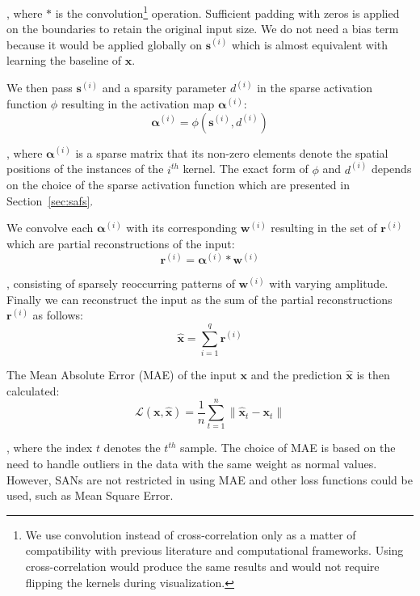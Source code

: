 \documentclass[journal]{IEEEtran}
\begin{document}
\noindent
, where $*$ is the convolution\footnote{We use convolution instead of cross-correlation only as a matter of compatibility with previous literature and computational frameworks. Using cross-correlation would produce the same results and would not require flipping the kernels during visualization.} operation.
Sufficient padding with zeros is applied on the boundaries to retain the original input size.
We do not need a bias term because it would be applied globally on $\bm{s}^{(i)}$ which is almost equivalent with learning the baseline of $\bm{x}$.

We then pass $\bm{s}^{(i)}$ and a sparsity parameter $d^{(i)}$ in the sparse activation function $\phi$ resulting in the activation map $\bm{\alpha}^{(i)}$:
\begin{equation}
	\label{eq:extrema}
	\bm{\alpha}^{(i)} = \phi(\bm{s}^{(i)}, d^{(i)})
\end{equation}

\noindent
, where $\bm{\alpha}^{(i)}$ is a sparse matrix that its non-zero elements denote the spatial positions of the instances of the $i^{th}$ kernel.
The exact form of $\phi$ and $d^{(i)}$ depends on the choice of the sparse activation function which are presented in Section~\ref{sec:safs}.

We convolve each $\bm{\alpha}^{(i)}$ with its corresponding $\bm{w}^{(i)}$ resulting in the set of $\bm{r}^{(i)}$ which are partial reconstructions of the input:
\begin{equation}
	\label{eq:reconstructions}
	\bm{r}^{(i)} = \bm{\alpha}^{(i)} * \bm{w}^{(i)}
\end{equation}

\noindent
, consisting of sparsely reoccurring patterns of $\bm{w}^{(i)}$ with varying amplitude.
Finally we can reconstruct the input as the sum of the partial reconstructions $\bm{r}^{(i)}$ as follows:
\begin{equation}
	\label{eq:output1}
	\hat{\bm{x}} = \sum\limits_{i=1}^q \bm{r}^{(i)}
\end{equation}

The Mean Absolute Error (MAE) of the input $\bm{x}$ and the prediction $\hat{\bm{x}}$ is then calculated:
\begin{equation}
	\label{eq:lossfunction}
	\mathcal{L}\left( {\bm{x},\hat{\bm{x}}} \right) = \frac{1}{n}\sum\limits_{t=1}^n \Big\lVert\hat{\bm{x}}_t - \bm{x}_t \Big\rVert
\end{equation}

\noindent
, where the index $t$ denotes the $t^{th}$ sample.
The choice of MAE is based on the need to handle outliers in the data with the same weight as normal values.
However, SANs are not restricted in using MAE and other loss functions could be used, such as Mean Square Error.
\end{document}
